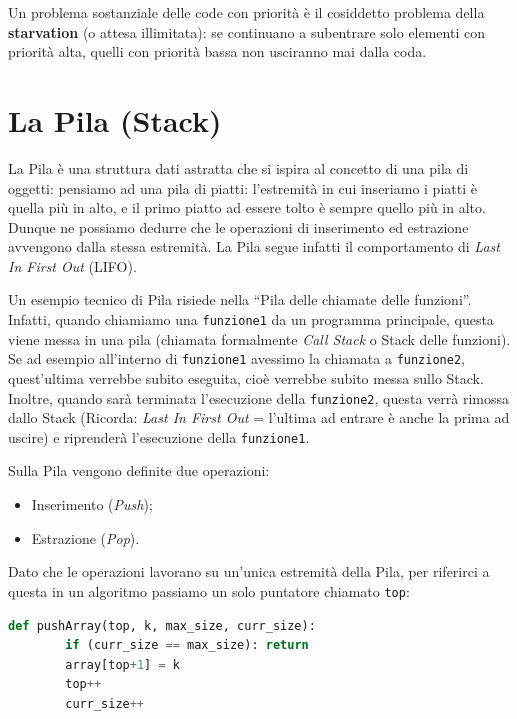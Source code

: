 \documentclass[12pt]{report}
\begin{document}
    Un problema sostanziale delle code con priorità è il cosiddetto problema della \textbf{starvation} (o attesa illimitata): se continuano a subentrare solo elementi con priorità alta, quelli con priorità bassa non usciranno mai dalla coda.
    
    \section{La Pila (Stack)}
    La Pila è una struttura dati astratta che si ispira al concetto di una pila di oggetti: pensiamo ad una pila di piatti: l'estremità in cui inseriamo i piatti è quella più in alto, e il primo piatto ad essere tolto è sempre quello più in alto. Dunque ne possiamo dedurre che le operazioni di inserimento ed estrazione avvengono dalla stessa estremità. La Pila segue infatti il comportamento di \textit{Last In First Out} (LIFO).
    
    Un esempio tecnico di Pila risiede nella ``Pila delle chiamate delle funzioni''.
    Infatti, quando chiamiamo una \texttt{funzione1} da un programma principale, questa viene messa in una pila (chiamata formalmente \textit{Call Stack} o Stack delle funzioni). Se ad esempio all'interno di \texttt{funzione1} avessimo la chiamata a \texttt{funzione2}, quest'ultima verrebbe subito eseguita, cioè verrebbe subito messa sullo Stack. Inoltre, quando sarà terminata l'esecuzione della \texttt{funzione2}, questa verrà rimossa dallo Stack (Ricorda: \textit{Last In First Out} = l'ultima ad entrare è anche la prima ad uscire) e riprenderà l'esecuzione della \texttt{funzione1}.
    
    Sulla Pila vengono definite due operazioni:
    \begin{itemize}
    	\item Inserimento (\textit{Push});
    	\item Estrazione (\textit{Pop}).
    \end{itemize}
    
    Dato che le operazioni lavorano su un'unica estremità della Pila, per riferirci a questa in un algoritmo passiamo un solo puntatore chiamato \texttt{top}:
    
    \begin{lstlisting}[language=Python, caption={Implementazione del Push tramite Array}]
    	def pushArray(top, k, max_size, curr_size):
    	if (curr_size == max_size): return
    	array[top+1] = k
    	top++
    	curr_size++
    \end{lstlisting}
    
\end{document}
